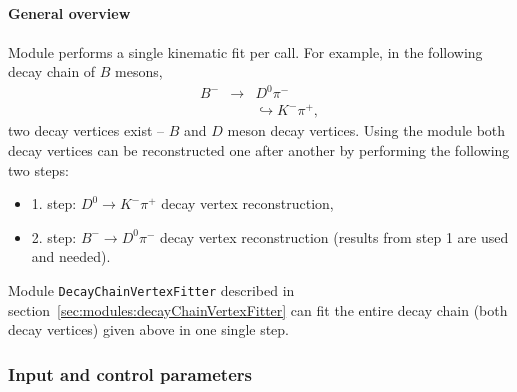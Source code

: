 \newpage
\subsection{\pVertexFitter}


\paragraph{General overview}

Module performs a single kinematic fit per call. For example, in the following decay chain of $B$ mesons,
\begin{eqnarray*}
 B^- & \to & D^0 \pi^-\\ 
& & \hookrightarrow K^-\pi^+,
\end{eqnarray*}
two decay vertices exist -- $B$ and $D$ meson decay vertices. Using the \pVertexFitter module both
decay vertices can be reconstructed one after another by performing the following two steps:
\begin{itemize}
 \item 1. step: $D^0 \to K^- \pi^+$ decay vertex reconstruction,
 \item 2. step: $B^- \to D^0 \pi^-$ decay vertex reconstruction (results from step 1 are used and needed).
\end{itemize}

Module {\tt DecayChainVertexFitter} described in section~\ref{sec:modules:decayChainVertexFitter} can fit the entire decay 
chain (both decay vertices) given above in one single step.

\subsubsection{Input and control parameters}

